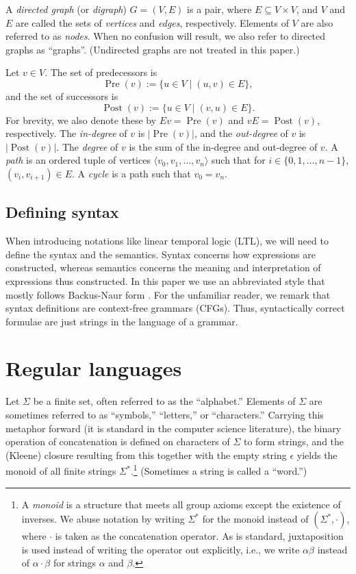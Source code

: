 \documentclass{amsart}
\DeclareMathOperator{\Pre}{Pre}
\DeclareMathOperator{\Post}{Post}
\theoremstyle{plain}
\theoremstyle{definition}
\theoremstyle{definition}
\begin{document}
A \textit{directed graph} (or \textit{digraph}) $G=(V,E)$ is a pair, where
$E\subseteq V\times V$, and $V$ and $E$ are called the sets of \textit{vertices}
and \textit{edges}, respectively.  Elements of $V$ are also referred to as
\textit{nodes}.  When no confusion will result, we also refer to directed graphs
as ``graphs''.  (Undirected graphs are not treated in this paper.)

Let $v\in V$.  The set of predecessors is
\[
\Pre(v) := \{ u\in V \mid (u,v) \in E \} ,
\]
and the set of successors is
\[
\Post(v) := \{ u\in V \mid (v,u) \in E \}.
\]
For brevity, we also denote these by $Ev=\Pre(v)$ and $vE=\Post(v)$,
respectively.  The \textit{in-degree} of $v$ is $\lvert \Pre(v) \rvert$, and the
\textit{out-degree} of $v$ is $\lvert \Post(v) \rvert$.  The \textit{degree} of
$v$ is the sum of the in-degree and out-degree of $v$.  A \textit{path} is an
ordered tuple of vertices $\langle v_{0} , v_{1} , \ldots , v_{n} \rangle$ such
that for $i\in \{0, 1,\ldots, n-1\}$, $(v_{i} , v_{i+1})\in E$.  A
\textit{cycle} is a path such that $v_{0}=v_{n}$.


\subsection{Defining syntax}

When introducing notations like linear temporal logic (LTL), we will need to
define the syntax and the semantics.  Syntax concerns how expressions are
constructed, whereas semantics concerns the meaning and interpretation of
expressions thus constructed.  In this paper we use an abbreviated style that
mostly follows Backus-Naur form \cite{Pattis}.  For the unfamiliar reader, we
remark that syntax definitions are context-free grammars (CFGs).  Thus,
syntactically correct formulae are just strings in the language of a grammar.


\section{Regular languages}\label{sec:reglang}

Let $\Sigma$ be a finite set, often referred to as the ``alphabet.''  Elements
of $\Sigma$ are sometimes referred to as ``symbols,'' ``letters,'' or
``characters.''  Carrying this metaphor forward (it is standard in the computer
science literature), the binary operation of concatenation is defined on
characters of $\Sigma$ to form strings, and the (Kleene) closure resulting from
this together with the empty string $\epsilon$ yields the monoid of all finite
strings $\Sigma^{*}$.\footnote{A \textit{monoid} is a structure that meets all
  group axioms except the existence of inverses. We abuse notation by writing
  $\Sigma^{*}$ for the monoid instead of $(\Sigma^{*}, \cdot )$, where $\cdot$
  is taken as the concatenation operator.  As is standard, juxtaposition is used
  instead of writing the operator out explicitly, i.e., we write $\alpha\beta$
  instead of $\alpha\cdot\beta$ for strings $\alpha$ and $\beta$.} (Sometimes a
string is called a ``word.'')
\end{document}
